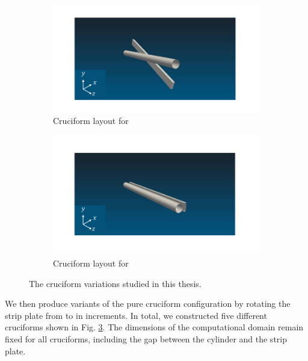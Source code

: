 \documentclass[oneside]{utmthesis}
\begin{document}
\begin{figure} \continuedfloat
  \centering
  \begin{subfigure}[h]{1\textwidth}
    \includegraphics[width=\textwidth]{figs/cruciform225}
    \caption{Cruciform layout for \angtw{}}
    \label{fig:cruciform22.5}
  \end{subfigure}

  \begin{subfigure}[h]{1\textwidth}
    \includegraphics[width=\textwidth]{figs/cruciform00}
    \caption{Cruciform layout for \angon{}}
    \label{fig:cruciform00}
  \end{subfigure}

  \caption{The cruciform variations studied in this thesis.}\label{fig:cruciformLayouts}
\end{figure}
We then produce variants of the pure cruciform configuration by rotating the strip plate from \angfi{} to \angon{} in \angtw{} increments. In total, we constructed five different cruciforms shown in Fig. \ref{fig:cruciformLayouts}. The dimensions of the computational domain remain fixed for all cruciforms, including the gap between the cylinder and the strip plate.
\end{document}
